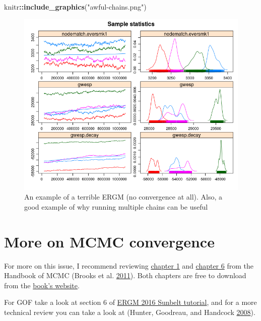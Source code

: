 \documentclass[]{book}
\newenvironment{Shaded}{\begin{snugshade}}{\end{snugshade}}
\newcommand{\KeywordTok}[1]{\textcolor[rgb]{0.13,0.29,0.53}{\textbf{#1}}}
\newcommand{\StringTok}[1]{\textcolor[rgb]{0.31,0.60,0.02}{#1}}
\newcommand{\OperatorTok}[1]{\textcolor[rgb]{0.81,0.36,0.00}{\textbf{#1}}}
\newcommand{\NormalTok}[1]{#1}
\theoremstyle{definition}
\theoremstyle{definition}
\theoremstyle{definition}
\theoremstyle{remark}
\begin{document}
\begin{Shaded}
\begin{Highlighting}[]
\NormalTok{knitr}\OperatorTok{::}\KeywordTok{include_graphics}\NormalTok{(}\StringTok{"awful-chains.png"}\NormalTok{)}
\end{Highlighting}
\end{Shaded}

\begin{figure}[!h]
\includegraphics[width=9.92in]{awful-chains} \caption{An example of a terrible ERGM (no convergence at all). Also, a good example of why running multiple chains can be useful}\label{fig:badconvergence}
\end{figure}

\section{More on MCMC convergence}\label{more-on-mcmc-convergence}

For more on this issue, I recommend reviewing
\href{http://www.mcmchandbook.net/HandbookChapter1.pdf}{chapter 1} and
\href{http://www.mcmchandbook.net/HandbookChapter6.pdf}{chapter 6} from
the Handbook of MCMC (Brooks et al.
\protect\hyperlink{ref-brooks2011}{2011}). Both chapters are free to
download from the
\href{http://www.mcmchandbook.net/HandbookSampleChapters.html}{book's
website}.

For GOF take a look at section 6 of
\href{https://statnet.csde.washington.edu/trac/raw-attachment/wiki/Sunbelt2016/ergm_tutorial.html}{ERGM
2016 Sunbelt tutorial}, and for a more technical review you can take a
look at (Hunter, Goodreau, and Handcock
\protect\hyperlink{ref-HunterJASA2008}{2008}).
\end{document}
